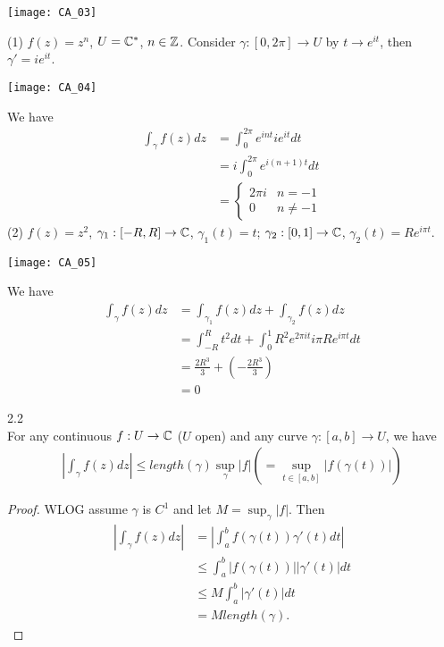 \documentclass[a4paper]{article}
\begin{document}
\texttt{[image: CA\_03]}

\begin{eg}
(1) $f(z) = z^n$, $U = \mathbb{C}^*$, $n \in \mathbb{Z}$. Consider $\gamma:[0,2\pi] \to U$ by $t \to e^{it}$, then $\gamma' =ie^{it}$. 

\texttt{[image: CA\_04]}

We have
\begin{equation*}
\begin{aligned}
\int_\gamma f(z) dz &= \int_0^{2\pi} e^{int}ie^{it} dt\\
&= i\int_0^{2\pi} e^{i(n+1)t}dt\\
&= \left\{ \begin{array}{ll}
2\pi i & n=-1\\
0 & n\neq -1
\end{array}\right.
\end{aligned}
\end{equation*}
(2) $f(z)=z^2$, $\gamma_1: [-R,R] \to \mathbb{C}$, $\gamma_1(t) = t$; $\gamma_2: [0,1] \to \mathbb{C}$, $\gamma_2(t) = Re^{i\pi t}$. 

\texttt{[image: CA\_05]}

We have
\begin{equation*}
\begin{aligned}
\int_\gamma f(z) dz &= \int_{\gamma_1} f(z) dz + \int_{\gamma_2} f(z) dz\\
&= \int_{-R}^R t^2 dt + \int_0^1 R^2 e^{2\pi it} i\pi R e^{i\pi t} dt\\
&= \frac{2R^3}{3} + \left(-\frac{2R^3}{3}\right)\\
&= 0
\end{aligned}
\end{equation*}
\end{eg}

\begin{prop} 2.2\\
For any continuous $f:U \to \mathbb{C}$ ($U$ open) and any curve $\gamma: [a,b] \to U$, we have
\begin{equation*}
\begin{aligned}
\left| \int_\gamma f(z) dz\right| \leq length(\gamma) \sup_\gamma |f| (= \sup_{t\in [a,b]} |f(\gamma(t))|)
\end{aligned}
\end{equation*}
\begin{proof}
WLOG assume $\gamma$ is $C^1$ and let $M = \sup_\gamma |f|$. Then
\begin{equation*}
\begin{aligned}
\left|\int_\gamma f(z) dz\right| &= \left|\int_a^b f(\gamma(t))\gamma'(t) dt\right|\\
&\leq \int_a^b |f(\gamma(t))||\gamma'(t)| dt\\
&\leq M\int_a^b |\gamma'(t)| dt\\
&= M length(\gamma).
\end{aligned}
\end{equation*}
\end{proof}
\end{prop}
\end{document}

